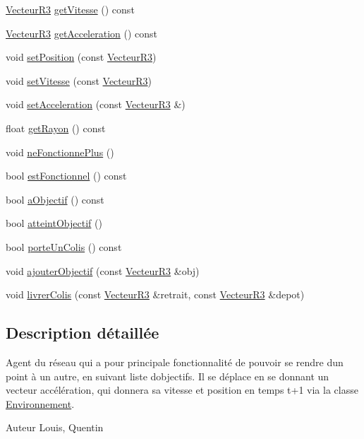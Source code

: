 \begin{DoxyCompactItemize}
\item 
\mbox{\hyperlink{class_vecteur_r3}{Vecteur\+R3}} \mbox{\hyperlink{class_drone_a4b6a219813286c95545bccdf061a5f48}{get\+Vitesse}} () const
\item 
\mbox{\hyperlink{class_vecteur_r3}{Vecteur\+R3}} \mbox{\hyperlink{class_drone_a87ea8e6f37a123251b59ad936e51d4ad}{get\+Acceleration}} () const
\item 
void \mbox{\hyperlink{class_drone_a6a379b028a7c5b48bac16966fef5e1a4}{set\+Position}} (const \mbox{\hyperlink{class_vecteur_r3}{Vecteur\+R3}})
\item 
void \mbox{\hyperlink{class_drone_a63d698e315ebab5f36dd74447259828f}{set\+Vitesse}} (const \mbox{\hyperlink{class_vecteur_r3}{Vecteur\+R3}})
\item 
void \mbox{\hyperlink{class_drone_a75aaefd8ca47db757ad38a10482aa042}{set\+Acceleration}} (const \mbox{\hyperlink{class_vecteur_r3}{Vecteur\+R3}} \&)
\item 
float \mbox{\hyperlink{class_drone_a03a089698c78f9f4dedc51b5dc7099c3}{get\+Rayon}} () const
\item 
void \mbox{\hyperlink{class_drone_a0e15629285db6c6c9f1b21ce138bf6ec}{ne\+Fonctionne\+Plus}} ()
\item 
bool \mbox{\hyperlink{class_drone_a6df0c61c5aa61884d87365696f33affd}{est\+Fonctionnel}} () const
\item 
bool \mbox{\hyperlink{class_drone_a42c8991a71af54828612cba245b84063}{a\+Objectif}} () const
\item 
bool \mbox{\hyperlink{class_drone_a4e2e166a9a0c5732e789d08c6cda56d1}{atteint\+Objectif}} ()
\item 
bool \mbox{\hyperlink{class_drone_aaa8aa9eedb05b4c46bd92e88d5f14441}{porte\+Un\+Colis}} () const
\item 
void \mbox{\hyperlink{class_drone_aec517cb61a036852752219bad4e732c1}{ajouter\+Objectif}} (const \mbox{\hyperlink{class_vecteur_r3}{Vecteur\+R3}} \&obj)
\item 
void \mbox{\hyperlink{class_drone_ae7249a3f0c054e2c1beb6ea522774029}{livrer\+Colis}} (const \mbox{\hyperlink{class_vecteur_r3}{Vecteur\+R3}} \&retrait, const \mbox{\hyperlink{class_vecteur_r3}{Vecteur\+R3}} \&depot)
\end{DoxyCompactItemize}


\subsection{Description détaillée}
Agent du réseau qui a pour principale fonctionnalité de pouvoir se rendre d\textquotesingle{}un point à un autre, en suivant liste d\textquotesingle{}objectifs. Il se déplace en se donnant un vecteur accélération, qui donnera sa vitesse et position en temps t+1 via la classe \mbox{\hyperlink{class_environnement}{Environnement}}. \begin{DoxyAuthor}{Auteur}
Louis, Quentin 
\end{DoxyAuthor}


